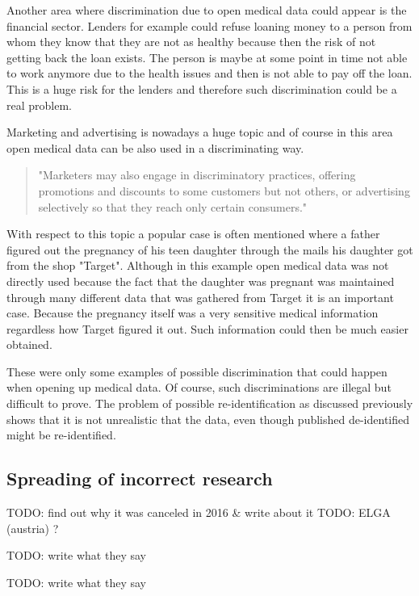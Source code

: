 \documentclass[a4paper, 11pt]{article}
\begin{document}
Another area where discrimination due to open medical data could appear is the financial sector. Lenders for example could refuse loaning money to a person from whom they know that they are not as healthy because then the risk of not getting back the loan exists. The person is maybe at some point in time not able to work anymore due to the health issues and then is not able to pay off the loan. This is a huge risk for the lenders and therefore such discrimination could be a real problem. \cite{hoffman2016promise}

Marketing and advertising is nowadays a huge topic and of course in this area open medical data can be also used in a discriminating way. 
\begin{quote}
    "Marketers may also engage in discriminatory practices, offering promotions and discounts to some customers but not others, or advertising selectively so that they reach only certain consumers." \cite[p.\ 1779]{Hoffman2015}
\end{quote}
With respect to this topic a popular case is often mentioned where a father figured out the pregnancy of his teen daughter through the mails his daughter got from the shop "Target". \cite{targetPregnantDaughter}
Although in this example open medical data was not directly used because the fact that the daughter was pregnant was maintained through many different data that was gathered from Target it is an important case. Because the pregnancy itself was a very sensitive medical information regardless how Target figured it out. Such information could then be much easier obtained. 

These were only some examples of possible discrimination that could happen when opening up medical data. Of course, such discriminations are illegal but difficult to prove. 
The problem of possible re-identification as discussed previously shows that it is not unrealistic that the data, even though published de-identified might be re-identified. \cite{Hoffman2015}


\subsection{Spreading of incorrect research}
\cite{Hoffman2015}


TODO: find out why it was canceled in 2016 & write about it
TODO: ELGA (austria) ?


TODO: write what they say
\cite{Vayena_et_al2015} 

TODO: write what they say
\cite{Fairchild631}
\end{document}
